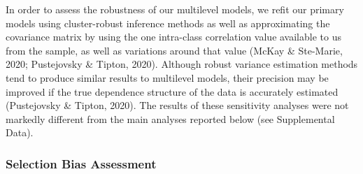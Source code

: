\documentclass[
  english,
  man, donotrepeattitle,mask,floatsintext]{apa7}
\begin{document}
In order to assess the robustness of our multilevel models, we refit our primary models using cluster-robust inference methods as well as approximating the covariance matrix by using the one intra-class correlation value available to us from the sample, as well as variations around that value (McKay \& Ste-Marie, 2020; Pustejovsky \& Tipton, 2020). Although robust variance estimation methods tend to produce similar results to multilevel models, their precision may be improved if the true dependence structure of the data is accurately estimated (Pustejovsky \& Tipton, 2020). The results of these sensitivity analyses were not markedly different from the main analyses reported below (see Supplemental Data).

\hypertarget{selection-bias-assessment}{%
\subsubsection{Selection Bias Assessment}\label{selection-bias-assessment}}
\end{document}
